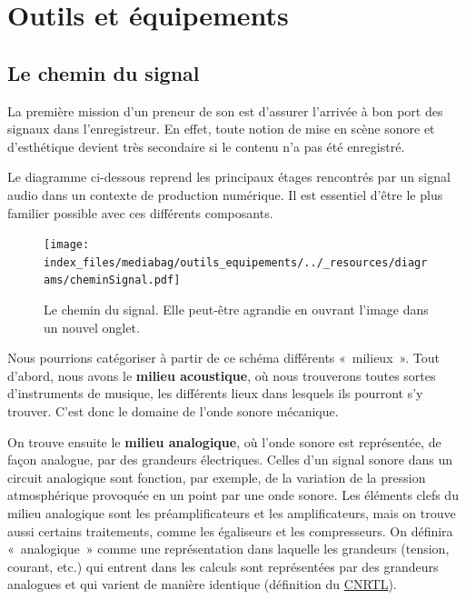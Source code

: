 \documentclass[
  letterpaper,
  DIV=11,
  numbers=noendperiod]{scrreprt}
\begin{document}
\part{Outils et équipements}

\hypertarget{le-chemin-du-signal}{%
\chapter{Le chemin du signal}\label{le-chemin-du-signal}}

La première mission d'un preneur de son est d'assurer l'arrivée à bon
port des signaux dans l'enregistreur. En effet, toute notion de mise en
scène sonore et d'esthétique devient très secondaire si le contenu n'a
pas été enregistré.

Le diagramme ci-dessous reprend les principaux étages rencontrés par un
signal audio dans un contexte de production numérique. Il est essentiel
d'être le plus familier possible avec ces différents composants.

\begin{figure}

{\centering \texttt{[image: index\_files/mediabag/outils\_equipements/../\_resources/diagrams/cheminSignal.pdf]}

}

\caption{\label{fig-chemin_sig}Le chemin du signal. Elle peut-être
agrandie en ouvrant l'image dans un nouvel onglet.}

\end{figure}

Nous pourrions catégoriser à partir de ce schéma différents «~milieux~».
Tout d'abord, nous avons le \textbf{milieu acoustique}, où nous
trouverons toutes sortes d'instruments de musique, les différents lieux
dans lesquels ils pourront s'y trouver. C'est donc le domaine de l'onde
sonore mécanique.

On trouve ensuite le \textbf{milieu analogique}, où l'onde sonore est
représentée, de façon analogue, par des grandeurs électriques. Celles
d'un signal sonore dans un circuit analogique sont fonction, par
exemple, de la variation de la pression atmosphérique provoquée en un
point par une onde sonore. Les éléments clefs du milieu analogique sont
les préamplificateurs et les amplificateurs, mais on trouve aussi
certains traitements, comme les égaliseurs et les compresseurs. On
définira «~analogique~» comme une représentation dans laquelle les
grandeurs (tension, courant, etc.) qui entrent dans les calculs sont
représentées par des grandeurs analogues et qui varient de manière
identique (définition du
\href{https://www.cnrtl.fr/definition/analogique}{CNRTL}).
\end{document}
